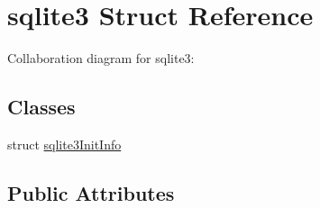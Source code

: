 \hypertarget{structsqlite3}{}\section{sqlite3 Struct Reference}
\label{structsqlite3}


Collaboration diagram for sqlite3\+:
\subsection*{Classes}
\begin{DoxyCompactItemize}
\item 
struct \hyperlink{structsqlite3_1_1sqlite3InitInfo}{sqlite3\+Init\+Info}
\end{DoxyCompactItemize}
\subsection*{Public Attributes}
